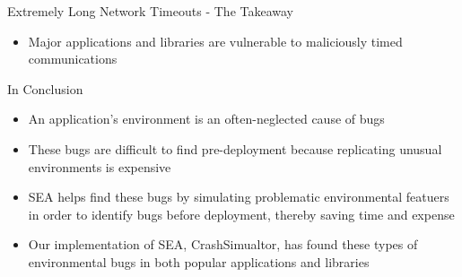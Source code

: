 \documentclass[pdf]{beamer}
\begin{document}
\begin{frame}{Extremely Long Network Timeouts - The Takeaway}
  \begin{itemize}
    \item{Major applications and libraries are vulnerable to maliciously
      timed communications}
  \end{itemize}
\end{frame}


\begin{frame}{In Conclusion}
  \begin{itemize}
    \item{An application's environment is an often-neglected cause of bugs}
    \item{These bugs are difficult to find pre-deployment because replicating
      unusual environments is expensive}
    \item{SEA helps find these bugs by simulating problematic environmental
      featuers in order to identify bugs before deployment, thereby
      saving time and expense}
    \item{Our implementation of SEA, CrashSimualtor, has found these types
      of environmental bugs in both popular applications and libraries}
  \end{itemize}
\end{frame}
\end{document}

